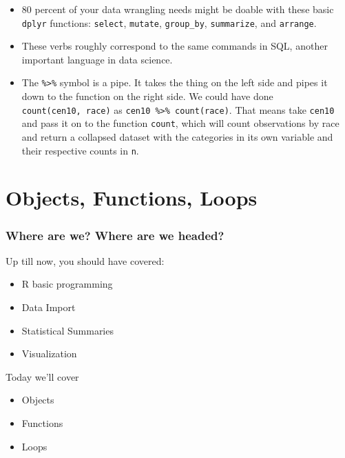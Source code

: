 \documentclass[
]{book}
\providecommand{\tightlist}{%
  \setlength{\itemsep}{0pt}\setlength{\parskip}{0pt}}
\theoremstyle{definition}
\theoremstyle{definition}
\theoremstyle{definition}
\theoremstyle{definition}
\theoremstyle{remark}
\begin{document}
\begin{itemize}
\tightlist
\item
  80 percent of your data wrangling needs might be doable with these basic \texttt{dplyr} functions: \texttt{select}, \texttt{mutate}, \texttt{group\_by}, \texttt{summarize}, and \texttt{arrange}.
\item
  These verbs roughly correspond to the same commands in SQL, another important language in data science.
\item
  The \texttt{\%\textgreater{}\%} symbol is a pipe. It takes the thing on the left side and pipes it down to the function on the right side. We could have done \texttt{count(cen10,\ race)} as \texttt{cen10\ \%\textgreater{}\%\ count(race)}. That means take \texttt{cen10} and pass it on to the function \texttt{count}, which will count observations by race and return a collapsed dataset with the categories in its own variable and their respective counts in \texttt{n}.
\end{itemize}

\hypertarget{robjloops}{%
\chapter{Objects, Functions, Loops}\label{robjloops}}

\hypertarget{where-are-we-where-are-we-headed-1}{%
\subsection*{Where are we? Where are we headed?}\label{where-are-we-where-are-we-headed-1}}

Up till now, you should have covered:

\begin{itemize}
\tightlist
\item
  R basic programming
\item
  Data Import
\item
  Statistical Summaries
\item
  Visualization
\end{itemize}

Today we'll cover

\begin{itemize}
\tightlist
\item
  Objects
\item
  Functions
\item
  Loops
\end{itemize}
\end{document}
